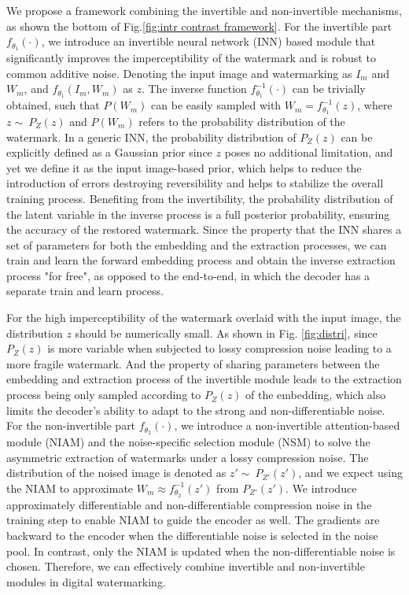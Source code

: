 \documentclass[sigconf]{acmart}
\begin{document}
We propose a framework combining the invertible and non-invertible mechanisms, as shown the bottom of Fig.\ref{fig:intr contrast framework}.
For the invertible part $f_{{\theta}_{1}}(\cdot)$, we introduce an invertible neural network (INN) based module that significantly improves the imperceptibility of the watermark and is robust to common additive noise. 
Denoting the input image and watermarking as $I_{m}$ and $W_{m}$, and $f_{{\theta}_{1}}(I_{m}, W_{m})$ as $z$. The inverse function $f_{{\theta}_{1}}^{-1}(\cdot)$ can be trivially obtained, such that $P(W_{m})$ can be easily sampled with $W_{m}=f_{{\theta}_{1}}^{-1}(z)$, where $z \sim\ P_{Z}(z)$ and $P({W}_{m})$ refers to the probability distribution of the watermark. In a generic INN, the probability distribution of $P_{Z}(z)$ can be explicitly defined as a Gaussian prior since $z$ poses no additional limitation\cite{hyvarinen1999nonlinear}, and yet we define it as the input image-based prior, which helps to reduce the introduction of errors destroying reversibility and helps to stabilize the overall training process\cite{cheng2021iicnet}. Benefiting from the invertibility, the probability distribution of the latent variable in the inverse process is a full posterior probability, ensuring the accuracy of the restored watermark. Since the property that the INN shares a set of parameters for both the embedding and the extraction processes, we can train and learn the forward embedding process and obtain the inverse extraction process "for free", as opposed to the end-to-end, in which the decoder has a separate train and learn process. 




For the high imperceptibility of the watermark overlaid with the input image, the distribution $z$ should be numerically small. As shown in Fig. \ref{fig:distri}, since $P_{Z}(z)$ is more variable when subjected to lossy compression noise leading to a more fragile watermark. And the property of sharing parameters between the embedding and extraction process of the invertible module leads to the extraction process being only sampled according to $P_{Z}(z)$ of the embedding, which also limits the decoder's ability to adapt to the strong and non-differentiable noise. 
For the non-invertible part $f_{{\theta}_{2}}(\cdot)$, we introduce a non-invertible attention-based module (NIAM) and the noise-specific selection module (NSM) to solve the asymmetric extraction of watermarks under a lossy compression noise. 
The distribution of the noised image is denoted as $z' \sim\ P_{Z'}(z')$, and we expect using the NIAM to approximate $W_{m}\approx f_{{\theta}_{2}}^{-1}(z')$ from $P_{Z'}(z')$.
We introduce approximately differentiable and non-differentiable compression noise in the training step to enable NIAM to guide the encoder as well.
The gradients are backward to the encoder when the differentiable noise is selected in the noise pool. In contrast, only the NIAM is updated when the non-differentiable noise is chosen.
Therefore, we can effectively combine invertible and non-invertible modules in digital watermarking.
\end{document}
